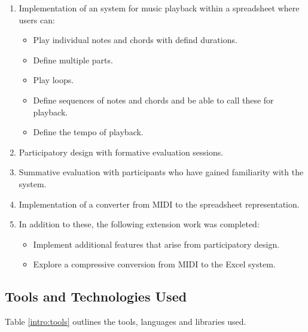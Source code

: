 \begin{enumerate}
  \item Implementation of an system for music playback within a spreadsheet where users can:
  \begin{itemize}
     \item Play individual notes and chords with defind durations.
     \item Define multiple parts.
     \item Play loops.
     \item Define sequences of notes and chords and be able to call these for playback.
     \item Define the tempo of playback.
   \end{itemize}
  \item Participatory design with formative evaluation sessions.
  \item Summative evaluation with participants who have gained familiarity with the system.
  \item Implementation of a converter from MIDI to the spreadsheet representation.
  \item In addition to these, the following extension work was completed:
  \begin{itemize}
     \item Implement additional features that arise from participatory design.
     \item Explore a compressive conversion from MIDI to the Excel system.
   \end{itemize}
\end{enumerate}

\subsection{Tools and Technologies Used}

Table \ref{intro:tools} outlines the tools, languages and libraries used.

